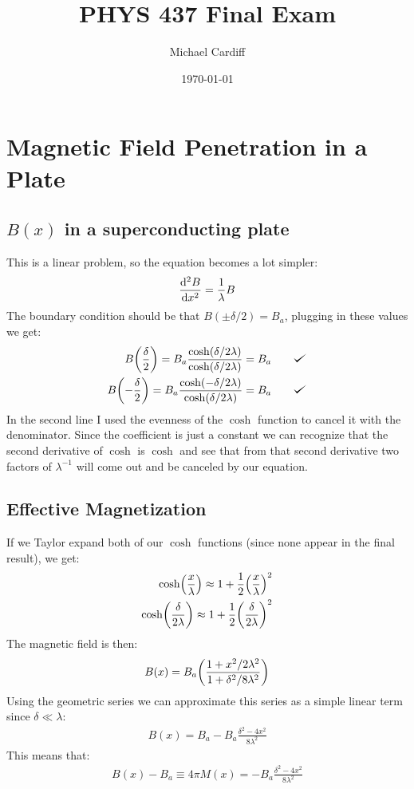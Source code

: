 \documentclass[12pt]{article}
\title{\vspace{-3em}PHYS 437 Final Exam}
\author{Michael Cardiff}
\date{\today}
\def\checkmark{\tikz\fill[scale=0.4](0,.35) -- (.25,0) -- (1,.7) -- (.25,.15) -- cycle;}
\begin{document}
\maketitle

\section{Magnetic Field Penetration in a Plate}

\subsection{$B(x)$ in a superconducting plate}
This is a linear problem, so the equation becomes a lot simpler:
\begin{align*}
  \dv[2]{B}{x}=\frac{1}{\lambda}B
\end{align*}
The boundary condition should be that $B(\pm\delta/2)=B_a$, plugging in these values we get:
\begin{align*}
  B\qty(\frac{\delta}{2})=B_a\frac{\cosh(\delta/2\lambda)}
  {\cosh(\delta/2\lambda)}=B_a\qquad&\text{\checkmark}\\
  B\qty(-\frac{\delta}{2})=B_a\frac{\cosh(-\delta/2\lambda)}
  {\cosh(\delta/2\lambda)}=B_a\qquad&\text{\checkmark}
\end{align*}
In the second line I used the evenness of the $\cosh$ function to cancel it with the denominator. Since the coefficient is just a constant we can recognize that the second derivative of $\cosh$ is $\cosh$ and see that from that second derivative two factors of $\lambda^{-1}$ will come out and be canceled by our equation. 
\subsection{Effective Magnetization}
If we Taylor expand both of our $\cosh$ functions (since none appear in the final result), we get:
\begin{align*}
  \cosh(\frac{x}{\lambda})\approx 1+\frac{1}{2}\qty(\frac{x}{\lambda})^2\\
  \cosh(\frac{\delta}{2\lambda})\approx
  1+\frac{1}{2}\qty(\frac{\delta}{2\lambda})^2
\end{align*}
The magnetic field is then:
\begin{align*}
  B(x)=B_a\qty(\frac{1+x^2/2\lambda^2}{1+\delta^2/8\lambda^2})
\end{align*}
Using the geometric series we can approximate this series as a simple linear term since $\delta\ll\lambda$:
\begin{align*}
  B(x)=B_a-B_a\frac{\delta^2-4x^2}{8\lambda^2}
\end{align*}
This means that:
\begin{align*}
  \boxed{B(x)-B_a\equiv 4\pi M(x)=-B_a\frac{\delta^2-4x^2}{8\lambda^2}}
\end{align*}
\end{document}
